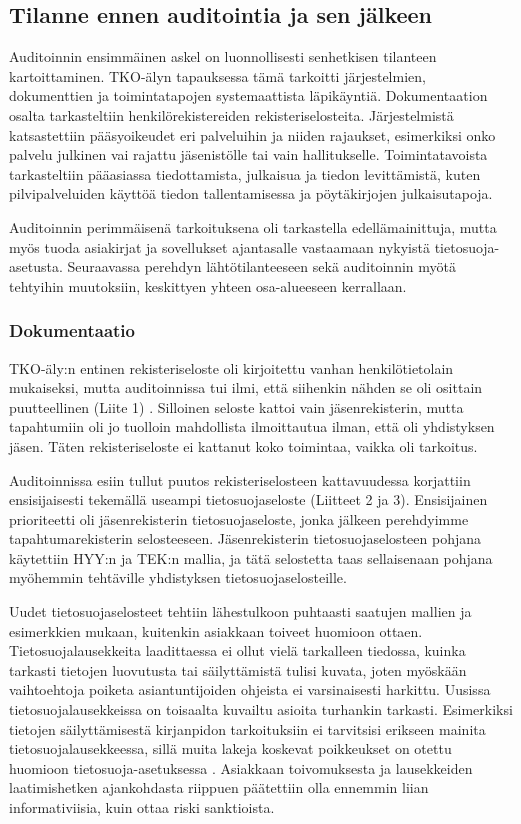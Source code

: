 \documentclass[finnish]{tktltiki}
\begin{document}
\subsection{Tilanne ennen auditointia ja sen jälkeen}

Auditoinnin ensimmäinen askel on luonnollisesti senhetkisen tilanteen kartoittaminen. TKO-älyn tapauksessa tämä tarkoitti järjestelmien, dokumenttien ja toimintatapojen systemaattista läpikäyntiä. Dokumentaation osalta tarkasteltiin henkilörekistereiden rekisteriselosteita. Järjestelmistä katsastettiin pääsyoikeudet eri palveluihin ja niiden rajaukset, esimerkiksi onko palvelu julkinen vai rajattu jäsenistölle tai vain hallitukselle. Toimintatavoista tarkasteltiin pääasiassa tiedottamista, julkaisua ja tiedon levittämistä, kuten pilvipalveluiden käyttöä tiedon tallentamisessa ja pöytäkirjojen julkaisutapoja.

Auditoinnin perimmäisenä tarkoituksena oli tarkastella edellämainittuja, mutta myös tuoda asiakirjat ja sovellukset ajantasalle vastaamaan nykyistä tietosuoja-asetusta. Seuraavassa perehdyn lähtötilanteeseen sekä auditoinnin myötä tehtyihin muutoksiin, keskittyen yhteen osa-alueeseen kerrallaan. 

\subsubsection{Dokumentaatio}

TKO-äly:n entinen rekisteriseloste oli kirjoitettu vanhan henkilötietolain mukaiseksi, mutta auditoinnissa tui ilmi, että siihenkin nähden se oli osittain puutteellinen (Liite 1) \cite{henkilotieto}. Silloinen seloste kattoi vain jäsenrekisterin, mutta tapahtumiin oli jo tuolloin mahdollista ilmoittautua ilman, että oli yhdistyksen jäsen. Täten rekisteriseloste ei kattanut koko toimintaa, vaikka oli tarkoitus. 

Auditoinnissa esiin tullut puutos rekisteriselosteen kattavuudessa korjattiin ensisijaisesti tekemällä useampi tietosuojaseloste (Liitteet 2 ja 3). Ensisijainen prioriteetti oli jäsenrekisterin tietosuojaseloste, jonka jälkeen perehdyimme tapahtumarekisterin selosteeseen. Jäsenrekisterin tietosuojaselosteen pohjana käytettiin HYY:n ja TEK:n mallia, ja tätä selostetta taas sellaisenaan pohjana myöhemmin tehtäville yhdistyksen tietosuojaselosteille. 

Uudet tietosuojaselosteet tehtiin lähestulkoon puhtaasti saatujen mallien ja esimerkkien mukaan, kuitenkin asiakkaan toiveet huomioon ottaen. Tietosuojalausekkeita laadittaessa ei ollut vielä tarkalleen tiedossa, kuinka tarkasti tietojen luovutusta tai säilyttämistä tulisi kuvata, joten myöskään vaihtoehtoja poiketa asiantuntijoiden ohjeista ei varsinaisesti harkittu. Uusissa tietosuojalausekkeissa on toisaalta kuvailtu asioita turhankin tarkasti. Esimerkiksi tietojen säilyttämisestä kirjanpidon tarkoituksiin ei tarvitsisi erikseen mainita tietosuojalausekkeessa, sillä muita lakeja koskevat poikkeukset on otettu huomioon tietosuoja-asetuksessa \cite{eu2016}. Asiakkaan toivomuksesta ja lausekkeiden laatimishetken ajankohdasta riippuen päätettiin olla ennemmin liian informativiisia, kuin ottaa riski sanktioista.
\end{document}
